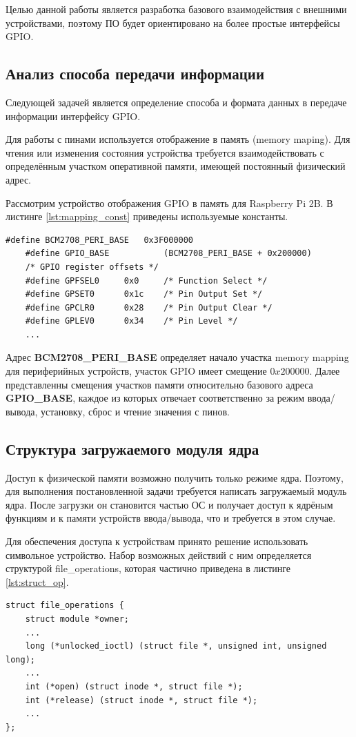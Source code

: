 Целью данной работы является разработка базового взаимодействия с внешними устройствами, поэтому  ПО будет ориентировано на более простые интерфейсы GPIO.

\subsection{Анализ способа передачи информации}
Следующей задачей является определение способа и формата данных в передаче информации интерфейсу GPIO.

Для работы с пинами используется отображение в память (memory maping). Для чтения или изменения состояния устройства требуется взаимодействовать с определённым участком оперативной памяти, имеющей постоянный физический адрес. 

Рассмотрим устройство отображения GPIO в память для Raspberry Pi 2B. В листинге \ref{lst:mapping_const} приведены используемые константы\cite{subj:gpio_addr}.
\begin{lstlisting}[caption = {Адреса отображения в память}, label=lst:mapping_const]
	#define BCM2708_PERI_BASE	0x3F000000
	#define GPIO_BASE           (BCM2708_PERI_BASE + 0x200000) 	
	/* GPIO register offsets */
	#define GPFSEL0		0x0		/* Function Select */
	#define GPSET0		0x1c	/* Pin Output Set */
	#define GPCLR0		0x28	/* Pin Output Clear */
	#define GPLEV0		0x34	/* Pin Level */
	...
\end{lstlisting}

Адрес \textbf{BCM2708\_PERI\_BASE} определяет начало участка memory mapping для периферийных устройств, участок GPIO имеет смещение $0x200000$. Далее представленны смещения участков памяти относительно базового адреса \textbf{GPIO\_BASE}, каждое из которых отвечает соответственно за режим ввода/вывода, установку, сброс и чтение значения с пинов.


\subsection{Структура загружаемого модуля ядра}
Доступ к физической памяти возможно получить только режиме ядра. Поэтому, для выполнения постановленной задачи требуется написать загружаемый модуль ядра. После загрузки он становится частью ОС и получает доступ к ядрёным функциям и к памяти устройств ввода/вывода, что и требуется в этом случае. 

Для обеспечения доступа к устройствам принято решение использовать символьное устройство. Набор возможных действий с ним определяется структурой file\_operations, которая частично приведена в листинге \ref{lst:struct_op}.
\begin{lstlisting}[caption = {Структура file\_operations}, label=lst:struct_op]
struct file_operations {
	struct module *owner;
	...
	long (*unlocked_ioctl) (struct file *, unsigned int, unsigned long);
	...
	int (*open) (struct inode *, struct file *);
	int (*release) (struct inode *, struct file *);
	...
};
\end{lstlisting}

